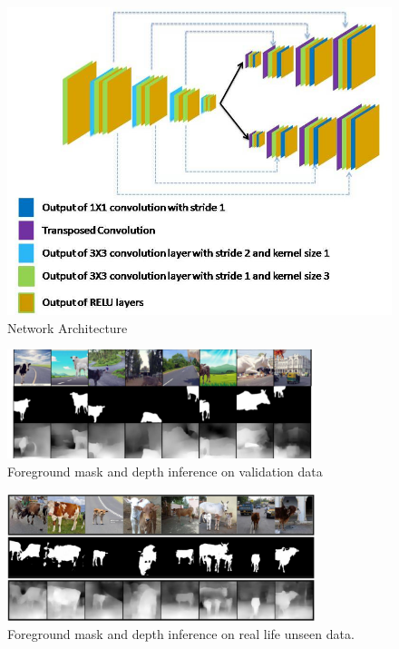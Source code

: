 \documentclass[review]{cvpr}
\begin{document}
\begin{figure}
  \centering
  \includegraphics[width=1.0\linewidth]{networkarchitecture.jpg}
  \caption{Network Architecture}
  \label{fig:modelarch}
\end{figure}

\begin{figure}
  \begin{center}
    \includegraphics[width=0.8\textwidth]{validinference.png}
  \end{center}
  \caption{Foreground mask and depth inference on validation data}
  \label{fig:validinfer}
\end{figure}


\begin{figure}
  \begin{center}
    \includegraphics[width=0.8\textwidth]{unseeninference.png}
  \end{center}
  \caption{Foreground mask and depth inference on real life unseen data.}
  \label{fig:unseeninfer}
\end{figure}
\end{document}
